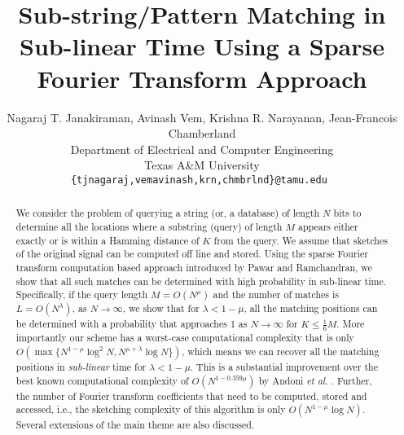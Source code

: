 \documentclass[sigconf]{acmart}
\begin{document}
\title[Sub-string Matching in Sub-linear Time]{Sub-string/Pattern Matching in Sub-linear Time Using a Sparse Fourier Transform Approach}

\author{Nagaraj T. Janakiraman, Avinash Vem, Krishna R. Narayanan, Jean-Francois Chamberland\\
Department of Electrical and Computer Engineering \\
Texas A\&M University\\
{\tt\small {\{tjnagaraj,vemavinash,krn,chmbrlnd\}@tamu.edu} }}

%
%
\renewcommand{\shortauthors}{Janakiraman et al.}

\begin{abstract}
	We consider the problem of querying a string (or, a database) of length $N$ bits to determine all the locations where a substring (query) of length $M$ appears either exactly or is within a Hamming distance of $K$ from the query. We assume that sketches of the original signal can be computed off line and stored. Using the sparse Fourier transform computation based approach introduced by Pawar and Ramchandran, we show that all such matches can be determined with high probability in sub-linear time. Specifically, if the query length $M = O(N^\mu)$ and the number of matches is $L=O(N^\lambda)$, as $N\rightarrow \infty$, we show that  for $\lambda < 1-\mu$, all the matching positions can be determined with a probability that approaches 1 as $N \rightarrow \infty$ for $K \leq \frac{1}{6}M$. More importantly our scheme has a worst-case computational complexity that is only $O\left(\max\{N^{1-\mu}\log^2 N, N^{\mu+\lambda}\log N \}\right)$, which means we can recover all the matching positions in {\it sub-linear} time for $\lambda<1-\mu$. This is a substantial improvement over the best known computational complexity of $O\left(N^{1-0.359 \mu} \right)$ by Andoni {\em et al.} \cite{andoni2013shift}. Further, the number of Fourier transform coefficients that need to be computed, stored and accessed, i.e., the sketching complexity of this algorithm is only $O\left(N^{1-\mu}\log N\right)$. Several extensions of the main theme are also discussed.
\end{abstract}
\end{document}
